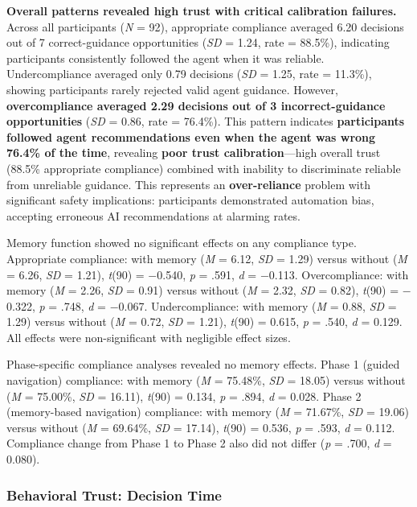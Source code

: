\documentclass[12pt]{article}
\begin{document}
\textbf{Overall patterns revealed high trust with critical calibration failures.} Across all participants (\textit{N} = 92), appropriate compliance averaged 6.20 decisions out of 7 correct-guidance opportunities (\textit{SD} = 1.24, rate = 88.5\%), indicating participants consistently followed the agent when it was reliable. Undercompliance averaged only 0.79 decisions (\textit{SD} = 1.25, rate = 11.3\%), showing participants rarely rejected valid agent guidance. However, \textbf{overcompliance averaged 2.29 decisions out of 3 incorrect-guidance opportunities} (\textit{SD} = 0.86, rate = 76.4\%). This pattern indicates \textbf{participants followed agent recommendations even when the agent was wrong 76.4\% of the time}, revealing \textbf{poor trust calibration}---high overall trust (88.5\% appropriate compliance) combined with inability to discriminate reliable from unreliable guidance. This represents an \textbf{over-reliance} problem with significant safety implications: participants demonstrated automation bias, accepting erroneous AI recommendations at alarming rates.

Memory function showed no significant effects on any compliance type. Appropriate compliance: with memory (\textit{M} = 6.12, \textit{SD} = 1.29) versus without (\textit{M} = 6.26, \textit{SD} = 1.21), \textit{t}(90) = $-$0.540, \textit{p} = .591, \textit{d} = $-$0.113. Overcompliance: with memory (\textit{M} = 2.26, \textit{SD} = 0.91) versus without (\textit{M} = 2.32, \textit{SD} = 0.82), \textit{t}(90) = $-$0.322, \textit{p} = .748, \textit{d} = $-$0.067. Undercompliance: with memory (\textit{M} = 0.88, \textit{SD} = 1.29) versus without (\textit{M} = 0.72, \textit{SD} = 1.21), \textit{t}(90) = 0.615, \textit{p} = .540, \textit{d} = 0.129. All effects were non-significant with negligible effect sizes.

Phase-specific compliance analyses revealed no memory effects. Phase 1 (guided navigation) compliance: with memory (\textit{M} = 75.48\%, \textit{SD} = 18.05) versus without (\textit{M} = 75.00\%, \textit{SD} = 16.11), \textit{t}(90) = 0.134, \textit{p} = .894, \textit{d} = 0.028. Phase 2 (memory-based navigation) compliance: with memory (\textit{M} = 71.67\%, \textit{SD} = 19.06) versus without (\textit{M} = 69.64\%, \textit{SD} = 17.14), \textit{t}(90) = 0.536, \textit{p} = .593, \textit{d} = 0.112. Compliance change from Phase 1 to Phase 2 also did not differ (\textit{p} = .700, \textit{d} = 0.080).

\subsubsection{Behavioral Trust: Decision Time}
\end{document}
